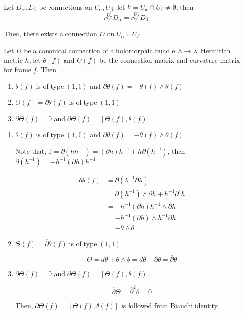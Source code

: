 \begin{lemma}
	Let $D_\alpha, D_\beta$ be connections on $U_\alpha, U_\beta$, let $V = U_\alpha \cap U_\beta \neq \emptyset$, then 
	$$
		r^{U_\alpha}_V D_\alpha = r^{U_\beta}_V D_\beta
	$$
	
	Then, there exists a connection $D$ on $U_\alpha \cup U_\beta$
\end{lemma}

\begin{proposition}
	Let $D$ be a canonical connection of a holomorphic bundle $E \to X$ Hermitian metric $h$, let $\theta(f)$ and $\Theta(f)$ be the connection matrix and curvature matrix for frame $f$. Then
	\begin{enumerate}
		\item $\theta(f)$ is of type $(1, 0)$ and $\partial \theta(f) = - \theta(f) \wedge \theta(f)$
		\item $\Theta(f) = \overline{\partial} \theta(f)$ is of type $(1, 1)$ 
		\item $\overline{\partial} \Theta(f) = 0$ and $\partial \Theta(f) = [\Theta(f), \theta(f)]$ 
	\end{enumerate}
\begin{longproof}
	\begin{enumerate}
		\item $\theta(f)$ is of type $(1, 0)$ and $\partial \theta(f) = - \theta(f) \wedge \theta(f)$
		
		Note that, $0 = \partial(h h^{-1}) = (\partial h) h^{-1} + h \partial(h^{-1})$, then $ \partial(h^{-1}) = - h^{-1} (\partial h) h^{-1}$
		
		\begin{align*}
			\partial \theta(f)
			&= \partial(h^{-1} \partial h) \\
			&= \partial(h^{-1}) \wedge \partial h + h^{-1} \partial^2 h \\
			&= - h^{-1} (\partial h) h^{-1} \wedge \partial h \\
			&= - h^{-1} (\partial h) \wedge h^{-1}  \partial h \\
			&= - \theta \wedge \theta
		\end{align*}
		
		\item $\Theta(f) = \overline{\partial} \theta(f)$ is of type $(1, 1)$ 
		
		$$
			\Theta = d\theta + \theta \wedge \theta = d \theta - \partial \theta = \overline{\partial} \theta
		$$

		\item $\overline{\partial} \Theta(f) = 0$ and $\partial \Theta(f) = [\Theta(f), \theta(f)]$ 
		
		$$
			\overline{\partial} \Theta = \overline{\partial}^2 \theta = 0
		$$
		
		Then, $\partial \Theta(f) = [\Theta(f), \theta(f)]$ is followed from Bianchi identity.
	\end{enumerate}
\end{longproof}
\end{proposition}

